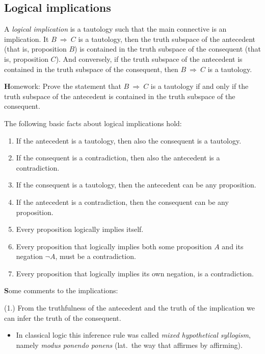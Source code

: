 \documentclass[11pt,paper=b5,footinclude,headinclude]{scrbook} %
\def\sledi {{~\Rightarrow~}}
\theoremstyle{remark}
\theoremstyle{definition} %
\begin{document}
\subsection{Logical implications}

A {\em logical implication} is a tautology such that the main connective is an implication.
It $B\sledi C$ is a tautology, then the truth subspace of the antecedent (that is, proposition $B$) is
 contained in the truth subspace of the consequent (that is, proposition $C$). And conversely,
 if the truth subspace of the antecedent is contained in the truth subspace of the consequent, then
$B\sledi C$ is a tautology.

{\textbf Homework:} Prove the statement that $B\sledi C$ is a tautology if and only if
the truth subspace of the antecedent is contained in the truth subspace of the consequent.

\bigskip
The following basic facts about logical implications hold:
\begin{enumerate}
  \item If the antecedent is a tautology, then also the consequent is a
  tautology.
  \item If the consequent is a contradiction, then also the antecedent is a contradiction.
  \item If the consequent is a tautology, then the antecedent can be any proposition.
  \item If the antecedent is a contradiction, then the consequent can be any proposition.
  \item Every proposition logically implies itself.
  \item Every proposition that logically implies both some proposition $A$ and its negation $\neg A$, must be a contradiction.
  \item Every proposition that logically implies its own negation, is a contradiction.
\end{enumerate}


{\textbf Some comments to the implications:}

(1.) From the truthfulness of the antecedent and the truth of the implication we can infer the truth of the consequent.
\begin{itemize}
  \item In classical logic this inference rule was called {\em mixed hypothetical syllogism}, namely {\em modus ponendo ponens} (lat.~the way that affirmes by affirming).
\end{itemize}
\end{document}
